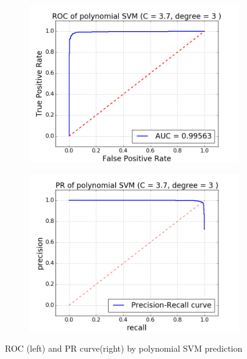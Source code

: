 \documentclass{article}
\begin{document}
\begin{singlespacing}
\begin{figure}[H]
    \centering
    \begin{subfigure}[b]{0.4\textwidth}
        \includegraphics[width=\textwidth]{psvm_roc.png}
    \end{subfigure}
    \begin{subfigure}[b]{0.4\textwidth}
        \includegraphics[width=\textwidth]{psvm_pr.png}
    \end{subfigure}
    \caption{ROC (left) and PR curve(right) by polynomial SVM prediction}\label{fig:psvm}
\end{figure}


\end{singlespacing}
\end{document}
